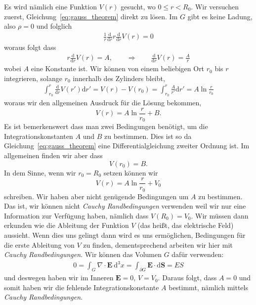\documentclass[A4paper, 12pt]{amsart}
\begin{document}
Es wird nämlich eine Funktion $ V(r) $ gesucht, wo
$ 0 \leq r < R_{0} $.
Wir versuchen zuerst, Gleichung~\ref{eq:gauss_theorem} direkt
zu lösen.
Im $ G $ gibt es keine Ladung, also $ \rho =0 $ und folglich %
\begin{align*}
  \frac{1}{r}
  \frac{\mathrm{d}}{\mathrm{d}r}
  r
  \frac{\mathrm{d}}{\mathrm{d}r}
  V(r)
  =0
\end{align*}
%
woraus folgt dass
\begin{align*}
  r
  \frac{\mathrm{d}}{\mathrm{d}r}
  V(r)
  = A,
  \qquad \Rightarrow \qquad
  \frac{\mathrm{d}}{\mathrm{d}r}
  V(r)
  =
  \frac{A}{r}
\end{align*}
wobei $ A $ eine Konstante ist.
Wir können von einem beliebigen Ort $ r_{0} $ bis $ r $ integrieren, solange
$ r_{0} $ innerhalb des Zylinders bleibt,
%
\begin{align*}
  \int_{r_{0}}^{r}
    \frac{\mathrm{d}}{\mathrm{d}r}
    V(r')
  \mathrm{d} r' =
  V(r) - V(r_{0}) =
  \int_{r_{0}}^{r}
    \frac{A}{r'}
  \mathrm{d} r' =
  A \ln \frac{r}{r_{0}}
\end{align*}
%
woraus wir den allgemeinen Ausdruck für die Lösung bekommen,
%
\begin{equation}
  V(r) =
  A \ln \frac{r}{r_{0}}
  +
  B
  .
\end{equation}
%
Es ist bemerkenswert dass man zwei Bedingungen benötigt, um die
Integrationskonstanten $ A $ und $ B $ zu bestimmen.
Dies ist so da
Gleichung~\ref{eq:gauss_theorem} eine Differentialgleichung zweiter Ordnung
ist. Im allgemeinen finden wir aber dass
%
\[
  V(r_{0}) = B.
\]
%
In dem Sinne, wenn wir
$ r_{0} = R_{0}$ setzen können wir
\begin{equation}
  V(r) =
  A \ln \frac{r}{r_{0}}
  +
  V_{0}
\end{equation}
schreiben.
Wir haben aber nicht genügende Bedingungen um $ A $ zu bestimmen.
Das ist, wir können nicht \textit{Cauchy Randbedingungen} verwenden
weil wir nur eine Information zur Verfügung haben, nämlich dass
$ V(R_{0}) = V_{0} $.
Wir müssen dann erkunden wie die Ableitung der Funktion $ V $ (das heißt,
das elektrische Feld) aussieht. Wenn dies uns gelingt dann wird es uns
ermöglichen, Bedingungen für die erste Ableitung von $ V $ zu finden,
dementsprechend arbeiten wir hier mit \textit{Cauchy Randbedingungen}.
Wir können das Volumen $ G $ dafür verwenden:
%
\begin{align*}
  0
  =
  \int_{G}
    \nabla \cdot \mathbf{E}
  \ \mathrm{d}^{3} x
  =
  \int_{\partial G}
    \mathbf{E} \cdot \mathrm{d}\mathbf{S}
  =
  E S
\end{align*}
%
und deswegen haben wir im Inneren $ \mathbf{E} = 0 $, $ V = V_{0} $.
Daraus folgt, dass $ A = 0 $ und somit haben wir die fehlende
Integrationskonstante $ A $ bestimmt, nämlich mittels \textit{Cauchy
Randbedingungen}.
\end{document}
